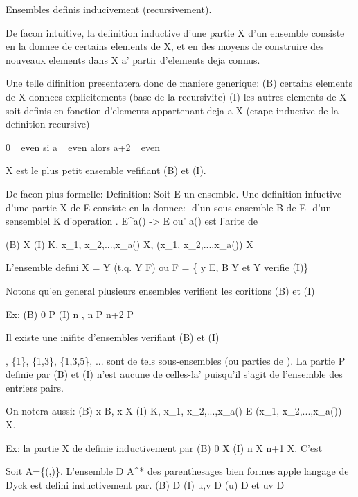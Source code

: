 \documentclass{article}
\begin{document}
Ensembles definis inducivement (recursivement).

De facon intuitive, la definition inductive d'une partie X d'un ensemble consiste en la donnee de certains elements de X, et en des moyens de construire des nouveaux elements dans X a' partir d'elements deja connus.

Une telle difinition presentatera donc de maniere generique:
	(B) certains elements de X donnees explicitements (base de la recursivite)
	(I) les autres elements de X soit definis en fonction d'elements appartenant deja a X (etape inductive de la definition recursive)

	0 \in \N_even
	si a \in \N_even alors a+2 \in \N_even

	X est le plus petit ensemble vefifiant (B) et (I).

	De facon plus formelle:
Definition: Soit E un ensemble. Une definition infuctive d'une partie X de E consiste en la donnee:
	-d'un sous-ensemble B de E
	-d'un sensemblel K d'operation \phi. E^{a(\phi)} -> E ou' a(\phi) est l'arite de \phi

	(B) \subseteq X
	(I) \forall \phi \in K, \forall x_1, x_2,...,x_{a(\phi)} \in X, \phi(x_1, x_2,...,x_{a(\phi)}) \in X

L'ensemble defini X = \cap Y (t.q. Y \in F) ou F = \{ y \subseteq E, B \subseteq Y et Y verifie (I)\}

Notons qu'en general plusieurs ensembles verifient les coritions (B) et (I)

Ex:
(B) 0 \in P
(I) \forall n \in \N, n \in P \rightarrow n+2 \in P

Il existe une inifite d'ensembles verifiant (B) et (I)

\N, \N\setminus\{1\}, \N\setminus\{1,3\},  \N\setminus\{1,3,5\}, ... sont de tels sous-ensembles (ou parties de \N). La partie P definie par (B) et (I) n'est aucune de celles-la' puisqu'il s'agit de l'ensemble des entriers pairs.

On notera aussi:
(B) \forall x \in B, x \in X
(I) \forall \phi \in K, x_1, x_2,...,x_{a(\phi)} \in E \rightarrow \phi(x_1, x_2,...,x_{a(\phi)}) \in X.

Ex: la partie X de \N definie inductivement par 
	(B) 0 \in X
	(I) n \in X \rightarrow n+1 \in X.
C'est \N


Soit A=\{(,)\}. L'ensemble D \subseteq A^* des parenthesages bien formes apple langage de Dyck est defini inductivement par.
	(B) \varepsilon \in D
	(I) u,v \in D \rightarrow (u) \in D et uv \in D
\end{document}
